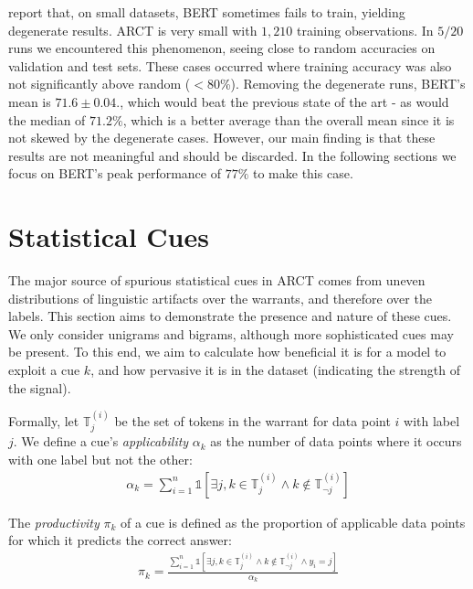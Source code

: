 \documentclass[11pt,a4paper]{article}
\begin{document}
\citeauthor{DevlinMKK18}  report that, on small datasets, BERT sometimes fails to train, yielding degenerate results. ARCT is very small with $1,210$ training observations. In $5/20$ runs we encountered this phenomenon, seeing close to random accuracies on validation and test sets. These cases occurred where training accuracy was also not significantly above random ($< 80$\%). Removing the degenerate runs, BERT's mean is $71.6 \pm 0.04$., which would beat the previous state of the art - as would the median of $71.2\%$, which is a better average than the overall mean since it is not skewed by the degenerate cases. However, our main finding is that these results are not meaningful and should be discarded. In the following sections we focus on BERT's peak performance of $77\%$ to make this case.

\section{Statistical Cues}

The major source of spurious statistical cues in ARCT comes from uneven distributions of linguistic artifacts over the warrants, and therefore over the labels. This section aims to demonstrate the presence and nature of these cues. We only consider unigrams and bigrams, although more sophisticated cues may be present. To this end, we aim to calculate how beneficial it is for a model to exploit a cue $k$, and how pervasive it is in the dataset (indicating the strength of the signal).

Formally, let $\mathbb{T}^{(i)}_j$ be the set of tokens in the warrant for data point $i$ with label $j$. We define a cue's \textit{applicability} $\alpha_k$ as the number of data points where it occurs with one label but not the other:
\begin{align*}
    \alpha_k = \sum_{i=1}^n \mathbb{1} \left[ \exists j, k \in \mathbb{T}^{(i)}_j \land k \notin \mathbb{T}^{(i)}_{\lnot j} \right]
\end{align*}

\noindent
The \textit{productivity} $\pi_k$ of a cue is defined as the proportion of applicable data points for which it predicts the correct answer:
\begin{align*}
    \pi_k = \frac{\sum_{i=1}^n \mathbb{1} \left[ \exists j, k \in \mathbb{T}^{(i)}_j \land k \notin \mathbb{T}^{(i)}_{\lnot j} \land y_i = j \right]}{\alpha_k}
\end{align*}
\end{document}
